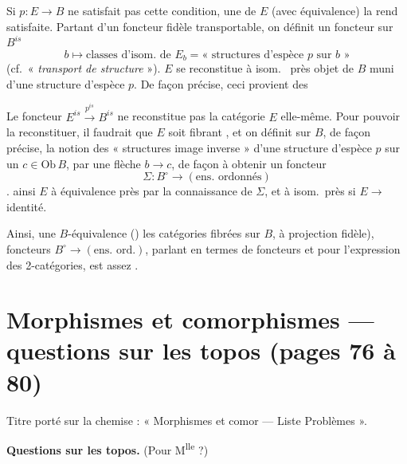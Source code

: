 \documentclass[11pt,a4paper]{article}
\begin{document}

Si $p : E \to B$ ne satisfait pas cette condition, une  de $E$ (avec équivalence) la rend satisfaite. Partant d'un foncteur
fidèle transportable, on définit  un foncteur
sur $B^{is}$
\[
  b \longmapsto \text{classes d'isom.\ de } E_{b}
  = \text{« structures d'espèce } p \text{ sur } b \text{ »}
\]
 (cf.\ « \emph{transport de
structure} »). $E$ se reconstitue à isom.\ \ill{} près \ill{} objet de $B$
\ill{} muni d'une structure d'espèce $p$. De façon précise, ceci provient des
\ill{}

Le foncteur $E^{is} \overset{p^{is}}{\longrightarrow} B^{is}$ ne reconstitue
pas la catégorie $E$ elle-même. Pour pouvoir la reconstituer, il faudrait que
$E$ soit fibrant \ill{}, et on définit sur $B$, de façon précise, la notion des
« structures image inverse » d'une structure d'espèce $p$ sur un
$c \in \mathrm{Ob}\, B$, par une flèche $b \to c$, de façon à obtenir un
foncteur
\[
  \Sigma : B^{\circ} \longrightarrow (\text{ens.\ ordonnés})
\]
. \ill{} ainsi $E$ à équivalence
près par la connaissance de $\Sigma$, et \ill{} à isom.\ près si $E \to$ \ill{}
identité.

Ainsi, une $B$-équivalence ()  les
catégories fibrées sur $B$, à projection fidèle), \ill{} foncteurs
$B^{\circ} \to (\text{ens.\ ord.})$, \ill{} parlant en termes de foncteurs
\struck{\ill{}} et pour l'expression des 2-catégories, \ill{}
 est assez .

\section*{Morphismes et comorphismes — questions sur les topos (pages 76 à 80)}

Titre porté sur la chemise : « Morphismes et comor — Liste
Problèmes ».


\textbf{Questions sur les topos.} (Pour M\textsuperscript{lle} \ill{} ?)
\end{document}
